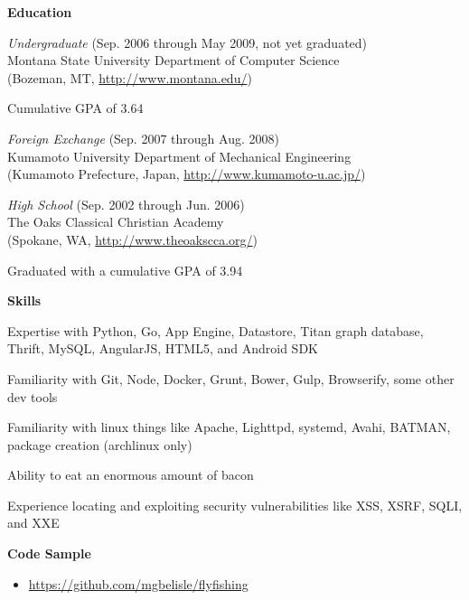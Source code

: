 \documentclass[10pt, a4paper]{article}
\begin{document}
\textbf{Education}
\begin{itemize*}
  \item \emph{Undergraduate} (Sep. 2006 through May 2009, not yet graduated)\\
    Montana State University Department of Computer Science\\
    (Bozeman, MT, \url{http://www.montana.edu/})
    \begin{itemize*}
      \item Cumulative GPA of 3.64
    \end{itemize*}
  \item \emph{Foreign Exchange} (Sep. 2007 through Aug. 2008) \\ Kumamoto University Department of Mechanical Engineering \\(Kumamoto Prefecture, Japan, \url{http://www.kumamoto-u.ac.jp/})
  \item \emph{High School} (Sep. 2002 through Jun. 2006)\\
    The Oaks Classical Christian Academy\\
    (Spokane, WA, \url{http://www.theoakscca.org/})
    \begin{itemize*}
      \item Graduated with a cumulative GPA of 3.94
    \end{itemize*}
\end{itemize*}
\textbf{Skills}
\begin{itemize*}
  \item Expertise with Python, Go, App Engine, Datastore, Titan graph database, Thrift, MySQL, AngularJS, HTML5, and Android SDK
  \item Familiarity with Git, Node, Docker, Grunt, Bower, Gulp, Browserify, some other dev tools
  \item Familiarity with linux things like Apache, Lighttpd, systemd, Avahi, BATMAN, package creation (archlinux only)
  \item Ability to eat an enormous amount of bacon
  \item Experience locating and exploiting security vulnerabilities like XSS, XSRF, SQLI, and XXE
\end{itemize*}
\textbf{Code Sample}
\begin{itemize}
  \item[] \url{https://github.com/mgbelisle/flyfishing}
\end{itemize}
\end{document}
